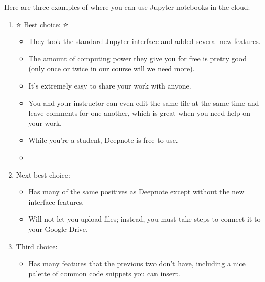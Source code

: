 \documentclass[letterpaper,10pt,english]{jupyterBook}
\begin{document}
\sphinxAtStartPar
Here are three examples of where you can use Jupyter notebooks in the cloud:
\begin{enumerate}
%
\item {} 
\sphinxAtStartPar
⭐ Best choice:  ⭐
\begin{itemize}
\item {} 
\sphinxAtStartPar
They took the standard Jupyter interface and added several new features.

\item {} 
\sphinxAtStartPar
The amount of computing power they give you for free is pretty good (only once or twice in our course will we need more).

\item {} 
\sphinxAtStartPar
It’s extremely easy to share your work with anyone.

\item {} 
\sphinxAtStartPar
You and your instructor can even edit the same file at the same time and leave comments for one another, which is great when you need help on your work.

\item {} 
\sphinxAtStartPar
While you’re a student, Deepnote is free to use.

\item {} 
\sphinxAtStartPar
{}

\end{itemize}

\item {} 
\sphinxAtStartPar
Next best choice: 
\begin{itemize}
\item {} 
\sphinxAtStartPar
Has many of the same positives as Deepnote except without the new interface features.

\item {} 
\sphinxAtStartPar
Will not let you upload files; instead, you must take steps to connect it to your Google Drive.

\end{itemize}

\item {} 
\sphinxAtStartPar
Third choice: 
\begin{itemize}
\item {} 
\sphinxAtStartPar
Has many features that the previous two don’t have, including a nice palette of common code snippets you can insert.


\end{itemize}
\end{enumerate}
\end{document}
